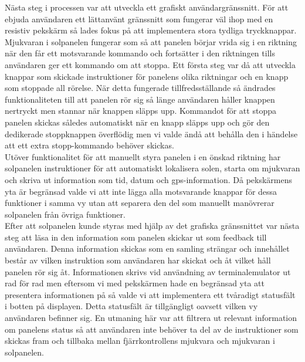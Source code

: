 \documentclass{article}
\begin{document}
            \noindent Nästa steg i processen var att utveckla ett grafiskt användargränssnitt. För att ebjuda användaren ett lättanvänt gränssnitt som fungerar väl ihop med en resistiv pekskärm
            så lades fokus på att implementera stora tydliga tryckknappar. 
            Mjukvaran i solpanelen fungerar som så att panelen börjar vrida sig i en riktning när den får ett motsvarande kommando och fortsätter i den riktningen tills användaren ger ett kommando om att stoppa. Ett första steg var då att utveckla knappar som skickade instruktioner för panelens olika riktningar och en knapp som stoppade all rörelse.
            När detta fungerade tillfredsställande så ändrades funktionaliteten till att panelen rör sig så länge användaren håller knappen nertryckt men stannar när knappen släpps upp.
            Kommandot för att stoppa panelen skickas således automatiskt när en knapp släpps upp och gör den dedikerade stoppknappen överflödig men vi valde ändå att behålla den i händelse att ett extra stopp-kommando behöver skickas. \\


            \noindent Utöver funktionalitet för att manuellt styra panelen i en önskad riktning har solpanelen instruktioner för att automatiskt lokalisera solen, starta om mjukvaran och skriva ut information som tid, datum och gps-information. Då pekskärmens yta är begränsad valde vi att inte lägga alla motsvarande knappar för dessa funktioner i samma vy utan att separera den del som manuellt manövrerar solpanelen från övriga funktioner.\\

            \noindent Efter att solpanelen kunde styras med hjälp av det grafiska gränssnittet var nästa steg att läsa in den information som panelen skickar ut som feedback till användaren. Denna information skickas som  en samling strängar och innehållet består av vilken instruktion som användaren har skickat och åt vilket håll panelen rör sig åt. 
            Informationen skrivs vid användning av terminalemulator ut rad för rad men eftersom vi med pekskärmen hade en begränsad yta att presentera informationen på så valde vi att implementera ett tvåradigt statusfält i botten på displayen. Detta statusfält är tillgängligt oavsett vilken vy användaren befinner sig.
            En utmaning här var att filtrera ut relevant information om panelens status så att användaren inte behöver ta del av de instruktioner som skickas fram och tillbaka mellan fjärrkontrollens mjukvara och mjukvaran i solpanelen. \\
\end{document}
